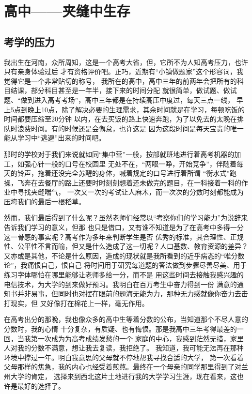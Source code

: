 \documentclass[AutoFakeBold]{LZUThesis}
\begin{document}
\section{高中——夹缝中生存}
\subsection{考学的压力}
我出生在河南，众所周知，这是一个高考大省，但，它所不为人知高考压力，也许只有亲身体验过后
才有资格评价吧。正巧，近期有“小镇做题家”这个形容词，我觉得它是一个非常贴切的称号，
我所在的高中，高中三年的前两年会把所有的科目结课，部分科目甚至是一年半，接下来的时间分配
就很简单，做试题、做试题、“做到进入高考考场”，高中三年都是在持续高压中度过，每天三点一线，
早上5点到晚上10点，除了解决必要的生理需求，其余时间就是在学习，每顿吃饭的时间都要压缩至20分钟
以内，在去买饭的路上快速奔跑，为了以免去的太晚在排队时浪费时间。有的时候还是会懈怠，也许这是
因为这段时间是每天宝贵的唯一能从学习中“逃避”出来的时间吧。

那时的学校对于我们来说就如同“集中营”一般，按部就班地进行着高考机器的加工，如强心针一般的口号在校园里
无处不在，“两眼一睁，开始竞争”，伴随着每天的铃声，拖着还没完全苏醒的身体，喊着规定的口号进行着所谓
“衡水式”跑操，飞奔在去餐厅的路上还要时时刻刻想着还未做完的题目，在一科接着一科的作业中寻找夹缝喘气，
一次又一次的考试让人麻木，而一次次的分数时刻都能成为压垮我们的最后一根稻草。

然而，我们最后得到了什么呢？虽然老师们经常以“考察你们的学习能力”为说辞来告诉我们学习的意义，但那
也只是借口，又有谁不知道是为了在高考中多得一分这一骨感的事实呢？高考作为多年来判断学生是否
优秀的标准，其合理性、正规性、公平性不言而喻，但又是什么造成了这一切呢？人口基数、教育资源的差异？
又亦或是其他，不论是什么原因，造成的现状就是我所看到的近乎病态的“唯分数论”，我痛恨自己，恨自己
将时间用于研究每道题的答法做到步骤尽善尽美、用于练习字体哪怕在哪里能够让老师多给一分，而不是
用这些时间去接触我感兴趣的电信技术，为大学的到来做好预习。我明白在百万考生中奋力得到一份
满意的通知书并非易事，但同时也对摆在眼前的题海无能为力，那种无力感就像你奋力去击打现实，但
又好像打在棉花上一样，毫无作用。

在高考出分的那晚，我也像众多的高中生等着分数的公布，当知道那个不尽人意的分数时，我的心情
十分复杂，有质疑、也有悔恨。那是我高中三年考得最差的一回，当我第一次成为为高考成绩发愁的一个
家庭的中心，我感到茫然无措，家里人对我的分数不满意，想让我去复读，我拒绝了。
我知道，我可能无法再在那种环境中撑过一年。明白我意思的父母就不停地帮我寻找合适的大学，
第一次看着父母那样的焦急，我的内心也经受着煎熬。最终在一个母亲的同学那里得到了对兰州大学的肯定，
选择来到西北这片土地进行我的大学学习生涯，现在看来，这也许是最好的选择了。
\end{document}
